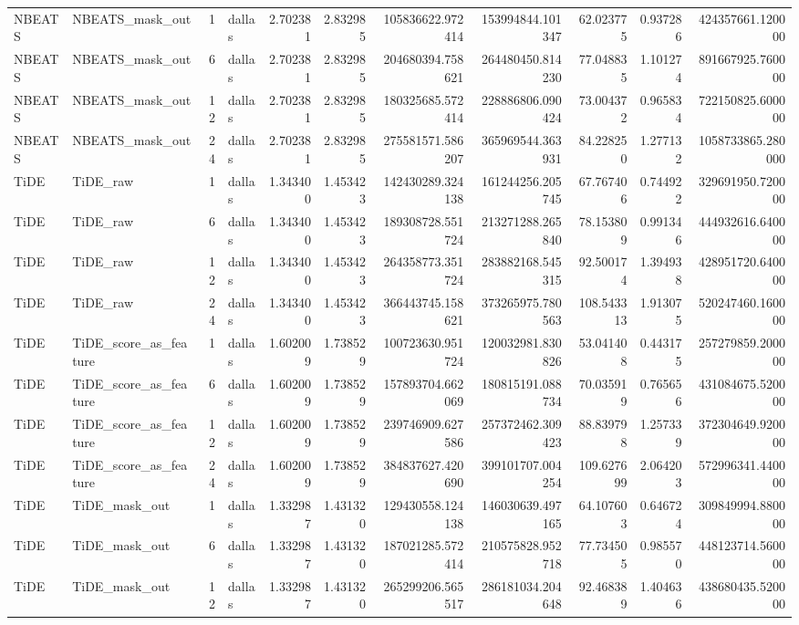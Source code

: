 \begin{longtable}{llrlrrrrrrr}
NBEATS & NBEATS\_mask\_out & 1 & dallas & 2.702381 & 2.832985 & 105836622.972414 & 153994844.101347 & 62.023775 & 0.937286 & 424357661.120000 \\
NBEATS & NBEATS\_mask\_out & 6 & dallas & 2.702381 & 2.832985 & 204680394.758621 & 264480450.814230 & 77.048835 & 1.101274 & 891667925.760000 \\
NBEATS & NBEATS\_mask\_out & 12 & dallas & 2.702381 & 2.832985 & 180325685.572414 & 228886806.090424 & 73.004372 & 0.965834 & 722150825.600000 \\
NBEATS & NBEATS\_mask\_out & 24 & dallas & 2.702381 & 2.832985 & 275581571.586207 & 365969544.363931 & 84.228250 & 1.277132 & 1058733865.280000 \\
TiDE & TiDE\_raw & 1 & dallas & 1.343400 & 1.453423 & 142430289.324138 & 161244256.205745 & 67.767406 & 0.744922 & 329691950.720000 \\
TiDE & TiDE\_raw & 6 & dallas & 1.343400 & 1.453423 & 189308728.551724 & 213271288.265840 & 78.153809 & 0.991346 & 444932616.640000 \\
TiDE & TiDE\_raw & 12 & dallas & 1.343400 & 1.453423 & 264358773.351724 & 283882168.545315 & 92.500174 & 1.394938 & 428951720.640000 \\
TiDE & TiDE\_raw & 24 & dallas & 1.343400 & 1.453423 & 366443745.158621 & 373265975.780563 & 108.543313 & 1.913075 & 520247460.160000 \\
TiDE & TiDE\_score\_as\_feature & 1 & dallas & 1.602009 & 1.738529 & 100723630.951724 & 120032981.830826 & 53.041408 & 0.443175 & 257279859.200000 \\
TiDE & TiDE\_score\_as\_feature & 6 & dallas & 1.602009 & 1.738529 & 157893704.662069 & 180815191.088734 & 70.035919 & 0.765656 & 431084675.520000 \\
TiDE & TiDE\_score\_as\_feature & 12 & dallas & 1.602009 & 1.738529 & 239746909.627586 & 257372462.309423 & 88.839798 & 1.257339 & 372304649.920000 \\
TiDE & TiDE\_score\_as\_feature & 24 & dallas & 1.602009 & 1.738529 & 384837627.420690 & 399101707.004254 & 109.627699 & 2.064203 & 572996341.440000 \\
TiDE & TiDE\_mask\_out & 1 & dallas & 1.332987 & 1.431320 & 129430558.124138 & 146030639.497165 & 64.107603 & 0.646724 & 309849994.880000 \\
TiDE & TiDE\_mask\_out & 6 & dallas & 1.332987 & 1.431320 & 187021285.572414 & 210575828.952718 & 77.734505 & 0.985570 & 448123714.560000 \\
TiDE & TiDE\_mask\_out & 12 & dallas & 1.332987 & 1.431320 & 265299206.565517 & 286181034.204648 & 92.468389 & 1.404636 & 438680435.520000 \\

\end{longtable}
